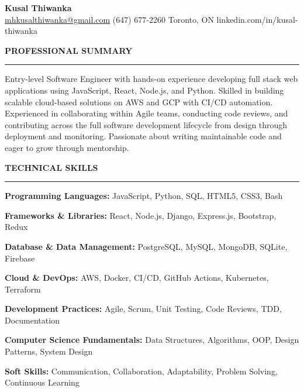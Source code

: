 \documentclass[10pt,letterpaper]{article}
\begin{document}
\begin{center}
{\LARGE\textbf{Kusal Thiwanka}}\\[3pt]
\href{mailto:mhkusalthiwanka@gmail.com}{mhkusalthiwanka@gmail.com}\hspace{2em}%
(647) 677{-}2260\hspace{2em}%
Toronto, ON\hspace{2em}
linkedin.com/in/kusal-thiwanka
\end{center}

\vspace{6pt}

\textbf{PROFESSIONAL SUMMARY}\\[-8pt]
\noindent\rule{\textwidth}{1pt}

\vspace{-2pt}

Entry-level Software Engineer with hands-on experience developing full stack web applications using JavaScript, React, Node.js, and Python. Skilled in building scalable cloud-based solutions on AWS and GCP with CI/CD automation. Experienced in collaborating within Agile teams, conducting code reviews, and contributing across the full software development lifecycle from design through deployment and monitoring. Passionate about writing maintainable code and eager to grow through mentorship.

\vspace{8pt}

\textbf{TECHNICAL SKILLS}\\[-8pt]
\noindent\rule{\textwidth}{1pt}

\vspace{-2pt}

\textbf{Programming Languages:} JavaScript, Python, SQL, HTML5, CSS3, Bash

\textbf{Frameworks \& Libraries:} React, Node.js, Django, Express.js, Bootstrap, Redux

\textbf{Database \& Data Management:} PostgreSQL, MySQL, MongoDB, SQLite, Firebase

\textbf{Cloud \& DevOps:} AWS, Docker, CI/CD, GitHub Actions, Kubernetes, Terraform

\textbf{Development Practices:} Agile, Scrum, Unit Testing, Code Reviews, TDD, Documentation

\textbf{Computer Science Fundamentals:} Data Structures, Algorithms, OOP, Design Patterns, System Design

\textbf{Soft Skills:} Communication, Collaboration, Adaptability, Problem Solving, Continuous Learning
\end{document}
